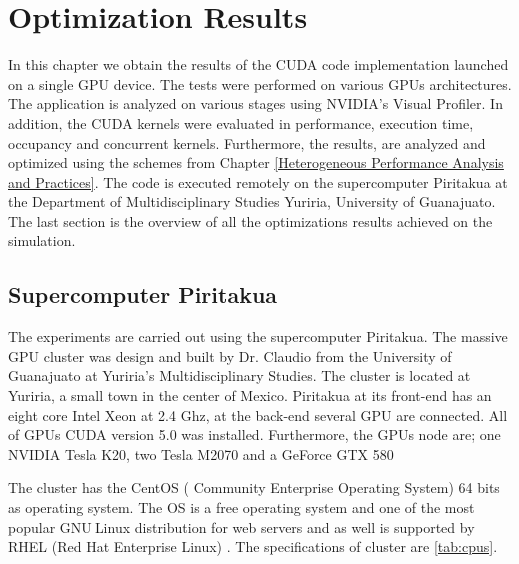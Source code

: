 
\chapter{Optimization Results} %

\label{Optimization Results} %



In this chapter we obtain the results of the CUDA code implementation launched on a single GPU device. The tests were performed on various GPUs architectures. The application is analyzed on various stages using NVIDIA's Visual Profiler. In addition, the CUDA kernels were evaluated in performance, execution time, occupancy and concurrent kernels. Furthermore, the results, are analyzed and optimized using the schemes from Chapter \ref{Heterogeneous Performance Analysis and Practices}. The code is executed remotely on the supercomputer Piritakua at the Department of Multidisciplinary Studies Yuriria, University of Guanajuato. The last section is the overview of all the optimizations results achieved on the simulation.

\section{Supercomputer Piritakua}

The experiments are carried out using the supercomputer Piritakua. The massive GPU cluster was design and built by Dr. Claudio from the University of Guanajuato at Yuriria's Multidisciplinary Studies. The cluster is located at Yuriria, a small town in the center of Mexico. Piritakua at its front-end has an eight core Intel Xeon at 2.4 Ghz, at the back-end several GPU are connected. All of GPUs CUDA version 5.0 was installed. Furthermore, the GPUs node are; one NVIDIA Tesla K20, two Tesla M2070 and a GeForce GTX 580 

The cluster has the CentOS ( Community Enterprise Operating System) 64 bits as operating system. The OS is a free operating system and one of the most popular GNU$ \ $Linux distribution for web servers and as well is supported by RHEL (Red Hat Enterprise Linux) \cite{centos}. The specifications of cluster are \ref{tab:cpus}.

